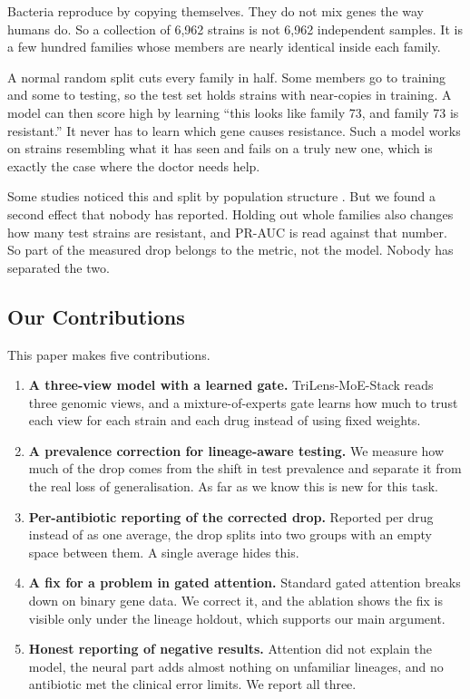 \documentclass[conference]{IEEEtran}
\begin{document}
Bacteria reproduce by copying themselves. They do not mix genes the way humans do.
So a collection of 6{,}962 strains is not 6{,}962 independent samples. It is a few
hundred families whose members are nearly identical inside each family.

A normal random split cuts every family in half. Some members go to training and
some to testing, so the test set holds strains with near-copies in training. A model
can then score high by learning ``this looks like family 73, and family 73 is
resistant.'' It never has to learn which gene causes resistance. Such a model works
on strains resembling what it has seen and fails on a truly new one, which is
exactly the case where the doctor needs help.

Some studies noticed this and split by population structure \cite{yu2025,hu2024}.
But we found a second effect that nobody has reported. Holding out whole families
also changes how many test strains are resistant, and PR-AUC is read against that
number. So part of the measured drop belongs to the metric, not the model. Nobody
has separated the two.

\subsection{Our Contributions}

This paper makes five contributions.

\begin{enumerate}
\item \textbf{A three-view model with a learned gate.} TriLens-MoE-Stack reads
three genomic views, and a mixture-of-experts gate learns how much to trust each
view for each strain and each drug instead of using fixed weights.

\item \textbf{A prevalence correction for lineage-aware testing.} We measure how
much of the drop comes from the shift in test prevalence and separate it from the
real loss of generalisation. As far as we know this is new for this task.

\item \textbf{Per-antibiotic reporting of the corrected drop.} Reported per drug
instead of as one average, the drop splits into two groups with an empty space
between them. A single average hides this.

\item \textbf{A fix for a problem in gated attention.} Standard gated attention
breaks down on binary gene data. We correct it, and the ablation shows the fix is
visible only under the lineage holdout, which supports our main argument.

\item \textbf{Honest reporting of negative results.} Attention did not explain the
model, the neural part adds almost nothing on unfamiliar lineages, and no
antibiotic met the clinical error limits. We report all three.
\end{enumerate}
\end{document}
